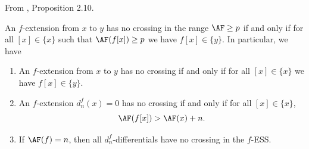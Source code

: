 \begin{proposition}
\label{paper:2.10}
From \cite{LWX126}, Proposition 2.10.\par
\label{prop:i8r47oe}
    An $f$-extension from $x$ to $y$ has no crossing in the range $\AF\ge p$ if and only if for all $[x]\in \{x\}$ such that $\AF(f[x])\ge p$ we have $f[x]\in \{y\}$. In particular, we have
    \begin{enumerate}
        \item An $f$-extension from $x$ to $y$ has no crossing if and only if for all $[x]\in \{x\}$ we have $f[x]\in \{y\}$.
        \item An $f$-extension $d_n^{f}(x)=0$ has no crossing if and only if for all $[x]\in \{x\}$,
        $$\AF(f[x]) >\AF(x)+n.$$
        \item If $\AF(f)=n$, then all $d^f_n$-differentials have no crossing in the $f$-ESS.
    \end{enumerate}


\end{proposition}
